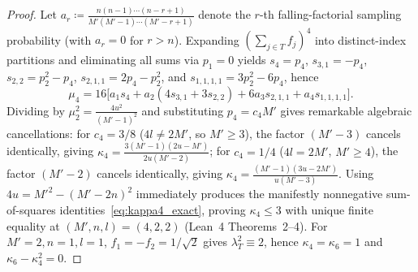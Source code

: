 \documentclass[11pt,a4paper]{article}
\theoremstyle{remark}
\begin{document}
\begin{proof}
Let $a_r \coloneqq \frac{n(n-1)\cdots(n-r+1)}{M'(M'-1)\cdots(M'-r+1)}$ denote the $r$-th falling-factorial sampling probability (with $a_r = 0$ for $r > n$). Expanding $(\sum_{j \in T} f_j)^4$ into distinct-index partitions and eliminating all sums via $p_1 = 0$ yields $s_4 = p_4$, $s_{3,1} = -p_4$, $s_{2,2} = p_2^2 - p_4$, $s_{2,1,1} = 2p_4 - p_2^2$, and $s_{1,1,1,1} = 3p_2^2 - 6p_4$, hence
\begin{equation}
\label{eq:mu4_exact}
\mu_4 = 16\bigl[a_1 s_4 + a_2(4 s_{3,1} + 3 s_{2,2}) + 6 a_3 s_{2,1,1} + a_4 s_{1,1,1,1}\bigr].
\end{equation}
Dividing by $\mu_2^2 = \frac{4 u^2}{(M'-1)^2}$ and substituting $p_4 = c_4 M'$ gives remarkable algebraic cancellations: for $c_4 = 3/8$ ($4l \neq 2M'$, so $M' \ge 3$), the factor $(M'-3)$ cancels identically, giving $\kappa_4 = \frac{3(M'-1)(2u - M')}{2u(M'-2)}$; for $c_4 = 1/4$ ($4l = 2M'$, $M' \ge 4$), the factor $(M'-2)$ cancels identically, giving $\kappa_4 = \frac{(M'-1)(3u - 2M')}{u(M'-3)}$. Using $4u = M'^2 - (M'-2n)^2$ immediately produces the manifestly nonnegative sum-of-squares identities~\eqref{eq:kappa4_exact}, proving $\kappa_4 \le 3$ with unique finite equality at $(M', n, l) = (4, 2, 2)$ (Lean~4 Theorems~2--4). For $M'=2, n=1, l=1$, $f_1 = -f_2 = 1/\sqrt{2}$ gives $\lambda_T^2 \equiv 2$, hence $\kappa_4 = \kappa_6 = 1$ and $\kappa_6 - \kappa_4^2 = 0$.


\end{proof}
\end{document}

